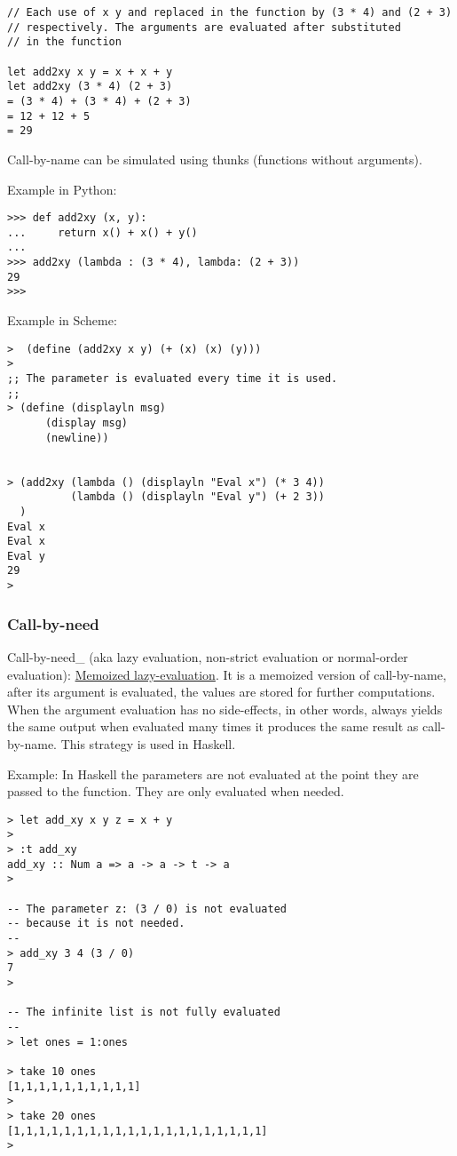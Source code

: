 \documentclass[11pt]{article}
\begin{document}
\begin{verbatim}
// Each use of x y and replaced in the function by (3 * 4) and (2 + 3)
// respectively. The arguments are evaluated after substituted 
// in the function

let add2xy x y = x + x + y
let add2xy (3 * 4) (2 + 3) 
= (3 * 4) + (3 * 4) + (2 + 3)
= 12 + 12 + 5
= 29
\end{verbatim}



Call-by-name can be simulated using thunks (functions without arguments).

Example in Python: 

\begin{verbatim}
>>> def add2xy (x, y):
...     return x() + x() + y()
... 
>>> add2xy (lambda : (3 * 4), lambda: (2 + 3))
29
>>>
\end{verbatim}

Example in Scheme:

\begin{verbatim}
>  (define (add2xy x y) (+ (x) (x) (y))) 
> 
;; The parameter is evaluated every time it is used. 
;;
> (define (displayln msg) 
      (display msg)
      (newline))


> (add2xy (lambda () (displayln "Eval x") (* 3 4))  
          (lambda () (displayln "Eval y") (+ 2 3))
  )               
Eval x
Eval x
Eval y
29
>
\end{verbatim}

\subsubsection{Call-by-need}
\label{sec-1-2-3}

Call-by-need\_ (aka lazy evaluation, non-strict evaluation or
normal-order evaluation): \uline{Memoized lazy-evaluation}. It is a 
memoized version of call-by-name, after its argument is evaluated,
the values are stored for further computations. When the argument
evaluation has no side-effects, in other words, always yields the
same output when evaluated many times it produces the same result
as call-by-name. This strategy is used in Haskell.

Example: In Haskell the parameters are not evaluated at the point they
are passed to the function. They are only evaluated when needed.

\begin{verbatim}
> let add_xy x y z = x + y
> 
> :t add_xy
add_xy :: Num a => a -> a -> t -> a
>

-- The parameter z: (3 / 0) is not evaluated 
-- because it is not needed.
-- 
> add_xy 3 4 (3 / 0)
7
> 

-- The infinite list is not fully evaluated 
--
> let ones = 1:ones

> take 10 ones
[1,1,1,1,1,1,1,1,1,1]
> 
> take 20 ones
[1,1,1,1,1,1,1,1,1,1,1,1,1,1,1,1,1,1,1,1]
>
\end{verbatim}
\end{document}
